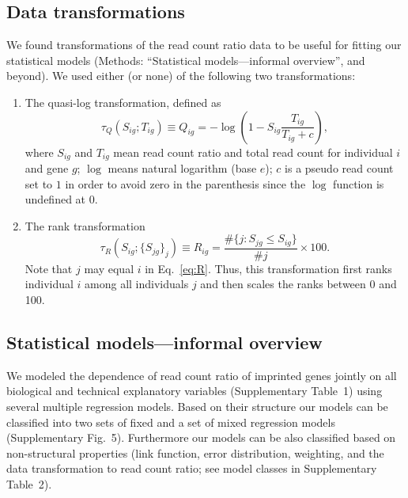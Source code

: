 \documentclass[letterpaper]{article}
\begin{document}
\subsection*{Data transformations}

We found transformations of the read count ratio data to be useful for fitting
our statistical models (Methods: ``Statistical models---informal overview'',
and beyond).  We used either (or none) of the following two transformations:

\begin{enumerate}
\item
The quasi-log transformation, defined as
\begin{equation}
\tau_Q(S_{ig};T_{ig}) \equiv Q_{ig} = - \log \left( 1 - S_{ig} \frac{T_{ig}}{T_{ig} + c}
\right),
\label{eq:Q}
\end{equation}
where \(S_{ig}\) and \(T_{ig}\) mean read count ratio and total read count for
individual \(i\) and gene \(g\);
\(\log\) means natural logarithm (base \(e\));  \(c\) is a pseudo read
count set to \(1\) in order to avoid zero in the parenthesis since the \(\log\)
function is undefined at \(0\).
\item 
The rank transformation
\begin{equation}
\tau_R(S_{ig};\{S_{jg}\}_j) \equiv R_{ig} = \frac{\# \{j: S_{jg}\le S_{ig}
\}}{\# j} \times 100.
\label{eq:R}
\end{equation}
Note that \(j\) may equal \(i\) in Eq.~\ref{eq:R}.
Thus, this transformation first ranks individual \(i\) among all individuals
\(j\) and then scales the ranks between 0 and 100.
\end{enumerate}

\subsection*{Statistical models---informal overview}
\label{sec:regression-overview-informal}

We modeled the dependence of read count ratio of imprinted genes jointly on
all biological and technical explanatory variables
(Supplementary Table~1) using several multiple regression models.  Based
on their structure our models can be classified into two sets of fixed and a
set of mixed regression models (Supplementary Fig.~5).  Furthermore
our models can be also classified based on non-structural properties (link
function, error distribution, weighting, and the data transformation to read
count ratio; see model classes in Supplementary Table~2).
\end{document}
